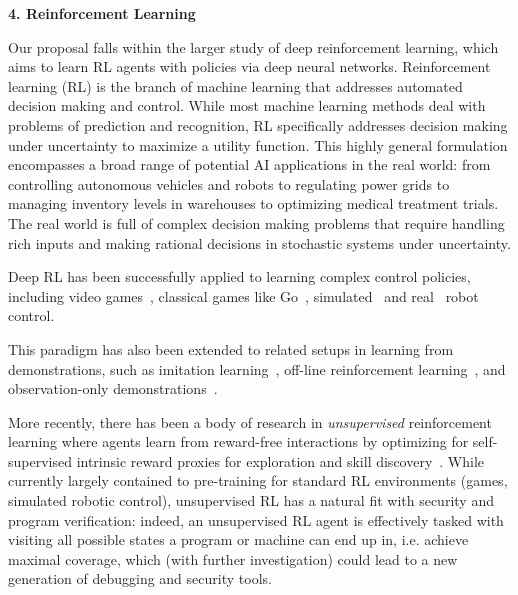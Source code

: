 \documentclass{NSF}
\begin{document}
\noindent \textbf{4. Reinforcement Learning}

Our proposal falls within the larger study of deep reinforcement learning, which aims to learn RL agents with policies via deep neural networks.
Reinforcement learning (RL) is the branch of machine learning that addresses automated decision making and control.
While most machine learning methods deal with problems of prediction and recognition, RL specifically addresses decision making under uncertainty to maximize a utility function.
This highly general formulation encompasses a broad range of potential AI applications in the real world: from controlling autonomous vehicles and robots to regulating power grids to managing inventory levels in warehouses to optimizing medical treatment trials.
The real world is full of complex decision making problems that require handling rich inputs and making rational decisions in stochastic systems under uncertainty.

Deep RL has been successfully applied to learning complex control policies, including video games~\cite{mnih2015human,openai2018dota,arulkumaran2017deep}, classical games like Go~\cite{silver2017alphago}, simulated~\cite{schulman2015trust,lillicrap2015continuous} and real~\cite{levine2016end,kalashnikov2018qt,openai2019solving,nagabandi2019deep} robot control.

This paradigm has also been extended to related setups in learning from demonstrations, such as imitation learning~\cite{ho2016generative,finn2016connection,kuefler2017imitating,fu2017learning}, off-line reinforcement learning~\cite{fujimoto2019off,kumar2019stabilizing,kumar2020conservative,kidambi2020morel,levine2020offline,yu2020mopo}, and observation-only demonstrations~\cite{liu2017imitation,torabi2018generative}.

More recently, there has been a body of research in \textit{unsupervised} reinforcement learning where agents learn from reward-free interactions by optimizing for self-supervised intrinsic reward proxies for exploration and skill discovery~\cite{pathakICMl17curiosity,pathak2019self,eysenbach2018diversity,hansen2019fast, sharma2019dynamics,liu2021aps,liu2021behavior,yarats2021reinforcement}.
While currently largely contained to pre-training for standard RL environments (games, simulated robotic control), unsupervised RL has a natural fit with security and program verification: indeed, an unsupervised RL agent is effectively tasked with visiting all possible states a program or machine can end up in, i.e. achieve maximal coverage, which (with further investigation) could lead to a new generation of debugging and security tools.
\end{document}
